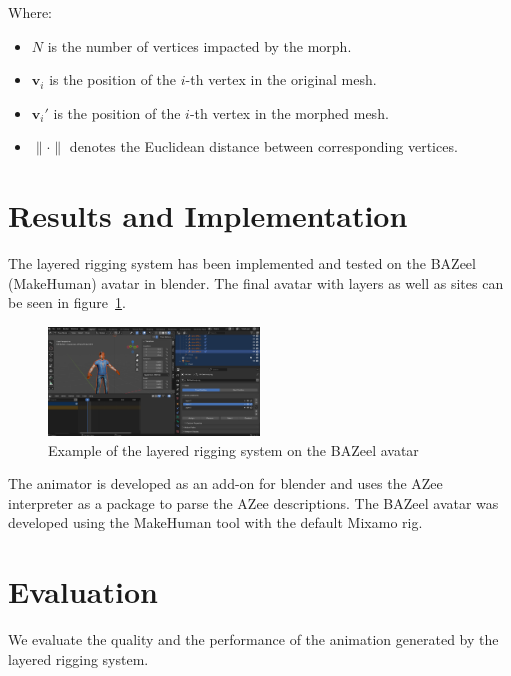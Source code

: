 \documentclass[../../main.tex]{subfiles}
\begin{document}
{Where:
\begin{itemize}
    \item \( N \) is the number of vertices impacted by the morph.
    \item \( \mathbf{v}_i \) is the position of the \( i \)-th vertex in the original mesh.
    \item \( \mathbf{v}_i' \) is the position of the \( i \)-th vertex in the morphed mesh.
    \item \( \|\cdot\| \) denotes the Euclidean distance between corresponding vertices.
\end{itemize}

\section{Results and Implementation}
\label{ch:avatar_creation_pose_synthesis:results}

The layered rigging system has been implemented and tested on the BAZeel (MakeHuman) avatar in blender. The final avatar with layers as well as sites can be seen in figure~\ref{fig:layers_example}.

\begin{figure}
    \centering
    \includegraphics[width=0.5\textwidth]{chapters/avatar_creation_pose_synthesis/images/layers_example.png}
    \caption{Example of the layered rigging system on the BAZeel avatar}
    \label{fig:layers_example}
\end{figure}

The animator is developed as an add-on for blender  and uses the AZee interpreter as a package to parse the AZee descriptions. The BAZeel avatar was developed using the MakeHuman tool with the default Mixamo rig. 

\section{Evaluation}
\label{ch:avatar_creation_pose_synthesis:evaluation}

We evaluate the quality and the performance of the animation generated by the layered rigging system.

}
\end{document}

